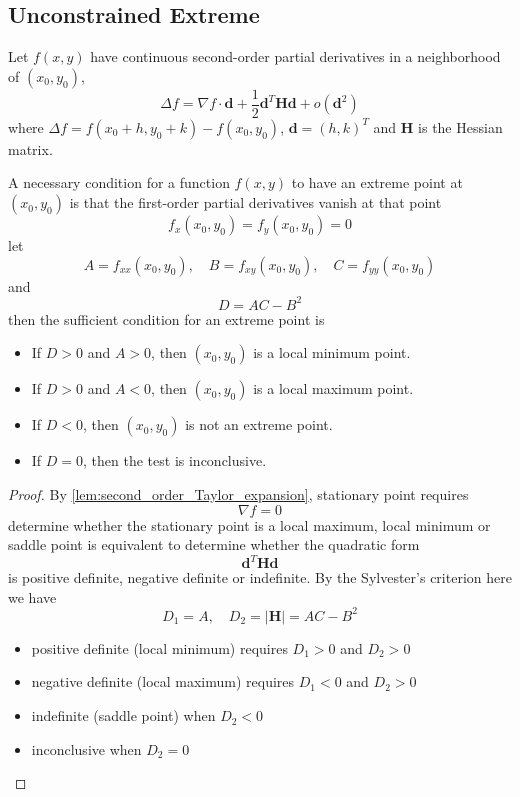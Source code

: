 \documentclass[a4]{overview}
\begin{document}
\subsection{Unconstrained Extreme}

\begin{lemma}
	\label{lem:second_order_Taylor_expansion}
	Let $f(x,y)$ have continuous second-order partial derivatives in a neighborhood of $(x_0,y_0)$, 
	\[
		\Delta f = \nabla f \cdot \boldsymbol{d}
		+ \frac12 \boldsymbol{d}^T \boldsymbol{H} \boldsymbol{d}
		+ o(\boldsymbol{d}^2)
	\] 
	where $\Delta f = f(x_0+h,y_0+k)-f(x_0,y_0)$, $\boldsymbol{d} = (h,k)^T$ and 
	$\boldsymbol{H}$ is the Hessian matrix.
	
\end{lemma}

\begin{theorem}

A necessary condition for a function $f(x,y)$ to have an extreme point at
 $(x_0,y_0)$ is that the first-order partial derivatives vanish at that point
\[
f_x(x_0,y_0) = f_y(x_0,y_0)=0
\] 
let
\[
	A = f_{xx}(x_0,y_0),\quad
	B = f_{xy}(x_0,y_0),\quad
	C = f_{yy}(x_0,y_0)
\] 
and
\[
	D = AC-B^2
\] 
then the sufficient condition for an extreme point is
\begin{itemize}
	\item If $D>0$ and $A>0$, then $(x_0,y_0)$ is a local minimum point.
	\item If $D>0$ and $A<0$, then $(x_0,y_0)$ is a local maximum point.
	\item If $D<0$, then $(x_0,y_0)$ is not an extreme point.
	\item If $D=0$, then the test is inconclusive.
\end{itemize}
	
\end{theorem}

\begin{proof}
	By \ref{lem:second_order_Taylor_expansion}, stationary point requires
	\[
	\nabla f = 0
	\] 
	determine whether the stationary point is a local maximum, local minimum or
	saddle point is equivalent to determine whether the quadratic form
	\[
	\boldsymbol{d}^T \boldsymbol{H} \boldsymbol{d}
	\]
	is positive definite, negative definite or indefinite. By the Sylvester's criterion
	here we have
	\[
		D_1 = A,\quad D_2 = |\boldsymbol{H}| = AC-B^2
	\] 
	\begin{itemize}
		\item positive definite (local minimum) requires $D_1>0$ and $D_2>0$
		\item negative definite (local maximum) requires $D_1<0$ and $D_2>0$
		\item indefinite (saddle point) when $D_2<0$
		\item inconclusive when $D_2=0$
	\end{itemize}
\end{proof}
\end{document}
